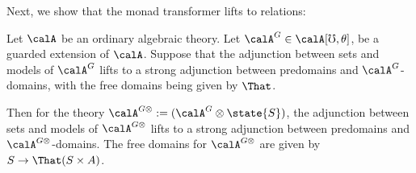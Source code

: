 Next, we show that the monad transformer lifts to relations:
\begin{lemma}\label{lem:state-monad-transformer-free-domains} Let $\calA$ be an
    ordinary algebraic theory. Let $\calA^G \in \calA[\mho, \theta]$, be a
    guarded extension of $\calA$. Suppose that the adjunction between sets and
    models of $\calA^G$ lifts to a strong adjunction between predomains and
    $\calA^G$-domains, with the free domains being given by $\That$.
    
    Then for the theory $\calA^{G\otimes} := (\calA^{G} \otimes \state{S})$, the
    adjunction between sets and models of $\calA^{G\otimes}$ lifts to a strong
    adjunction between predomains and $\calA^{G\otimes}$-domains.
    The free domains for $\calA^{G\otimes}$ are given by $S \to \That(S \times A)$.
\end{lemma}
